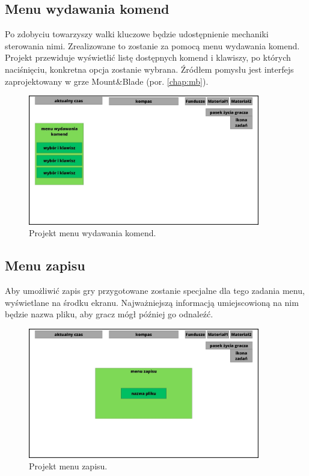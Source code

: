 \subsection{Menu wydawania komend}
Po zdobyciu towarzyszy walki kluczowe będzie udostępnienie mechaniki sterowania nimi. Zrealizowane to zostanie za pomocą menu wydawania komend.
Projekt przewiduje wyświetlić listę dostępnych komend i klawiszy, po których naciśnięciu, konkretna opcja zostanie wybrana. 
Źródłem pomysłu jest interfejs zaprojektowany w grze Mount\&Blade (por. \ref{chap:mb}).

\begin{figure}[htbp]
    \centering
    \includegraphics[width=0.9\textwidth]{images/ui/ui_proj_walka.jpg}
    \caption{Projekt menu wydawania komend.}\label{fig:cmd_menu}
\end{figure}

\subsection{Menu zapisu}
Aby umożliwić zapis gry przygotowane zostanie specjalne dla tego zadania menu, wyświetlane na środku ekranu. Najważniejszą informacją 
umiejscowioną na nim będzie nazwa pliku, aby gracz mógł później go odnaleźć.
\begin{figure}[htbp]
    \centering
    \includegraphics[width=0.9\textwidth]{images/ui/ui_proj_zapis.jpg}
    \caption{Projekt menu zapisu.}\label{fig:men_zap}
\end{figure}

